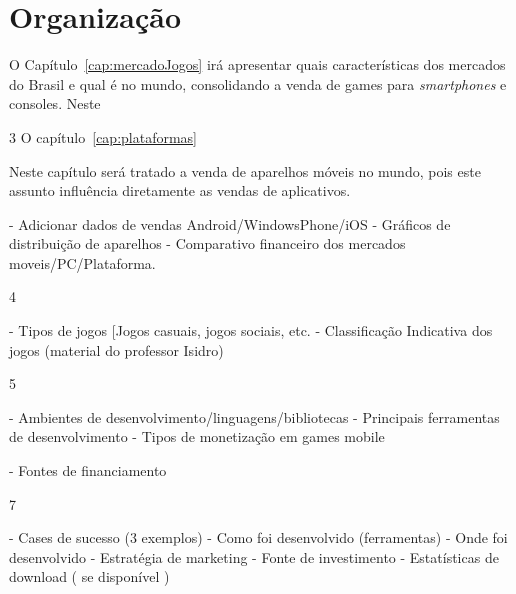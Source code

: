 
\section{Organização}


O Capítulo~\ref{cap:mercadoJogos} irá apresentar quais características dos mercados do Brasil e qual é no mundo, consolidando a venda de games para \emph{smartphones} e consoles. Neste 


3
O capítulo~\ref{cap:plataformas} 

Neste capítulo será tratado a venda de aparelhos móveis no mundo, pois este assunto influência diretamente as vendas de aplicativos.



- Adicionar dados de vendas Android/WindowsPhone/iOS
- Gráficos de distribuição de aparelhos
- Comparativo financeiro dos mercados moveis/PC/Plataforma.


4

- Tipos de jogos [Jogos casuais, jogos sociais, etc.
- Classificação Indicativa dos jogos (material do professor Isidro)


5

- Ambientes de desenvolvimento/linguagens/bibliotecas
- Principais ferramentas de desenvolvimento
- Tipos de monetização em games mobile


- Fontes de financiamento


7 

- Cases de sucesso (3 exemplos)
	- Como foi desenvolvido (ferramentas)
	- Onde foi desenvolvido
	- Estratégia de marketing
	- Fonte de investimento
	- Estatísticas de download ( se disponível )
	

